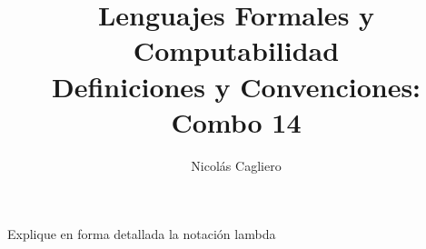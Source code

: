 \documentclass{article}
\title{Lenguajes Formales y Computabilidad \\
        \large Definiciones y Convenciones: Combo 14 }
\author{Nicolás Cagliero}
\begin{document}
\maketitle

Explique en forma detallada la notación lambda
\end{document}
